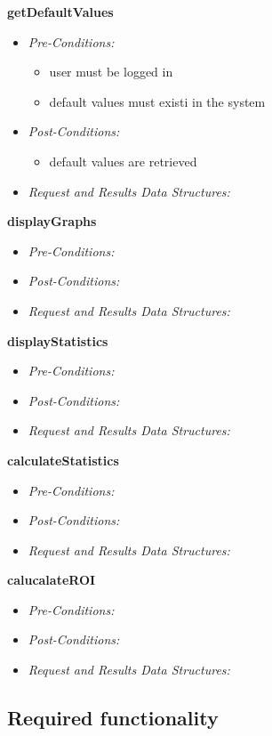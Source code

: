 \documentclass[a4paper,12pt]{article}
\begin{document}
\textbf{\large{getDefaultValues}}
	\begin{itemize}
		\item \textit{Pre-Conditions:}
		\begin{itemize}
			\item user must be logged in
			\item default values must existi in the system
		\end{itemize}
		\item \textit{Post-Conditions:}
		\begin{itemize}
			\item default values are retrieved
		\end{itemize}
		\item \textit{Request and Results Data Structures:}
	\end{itemize}
\textbf{\large{displayGraphs}}
	\begin{itemize}
		\item \textit{Pre-Conditions:}
		\item \textit{Post-Conditions:}
		\item \textit{Request and Results Data Structures:}
	\end{itemize}
\textbf{\large{displayStatistics}}
	\begin{itemize}
		\item \textit{Pre-Conditions:}
		\item \textit{Post-Conditions:}
		\item \textit{Request and Results Data Structures:}
	\end{itemize}
\textbf{\large{calculateStatistics}}
	\begin{itemize}
		\item \textit{Pre-Conditions:}
		\item \textit{Post-Conditions:}
		\item \textit{Request and Results Data Structures:}
	\end{itemize}
\textbf{\large{calucalateROI}}
	\begin{itemize}
		\item \textit{Pre-Conditions:}
		\item \textit{Post-Conditions:}
		\item \textit{Request and Results Data Structures:}
	\end{itemize}

\subsection{Required functionality}
\end{document}
